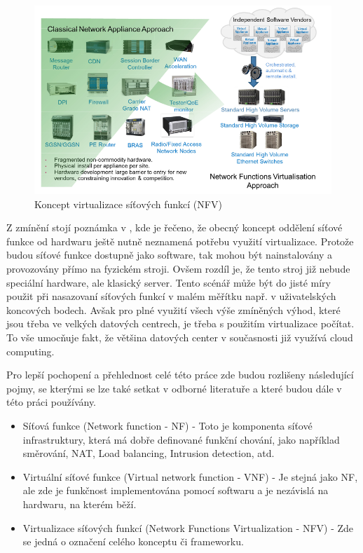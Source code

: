 \begin{figure}[h]
\begin{centering}
\includegraphics[scale=0.5]{images/vize_NFV}
\par\end{centering}
\caption{Koncept virtualizace síťových funkcí (NFV)\label{fig:vize_NFV}}
\end{figure}

Z zmínění stojí poznámka v \cite{NFVState}, kde je řečeno, že obecný koncept oddělení síťové funkce od hardwaru ještě nutně neznamená potřebu využití virtualizace. Protože budou síťové funkce dostupně jako software, tak mohou být nainstalovány a provozovány přímo na fyzickém stroji. Ovšem rozdíl je, že tento stroj již nebude speciální hardware, ale klasický server. Tento scénář může být do jisté míry použit při nasazovaní síťových funkcí v malém měřítku např. v uživatelských koncových bodech. Avšak pro plné využití všech výše zmíněných výhod, které jsou třeba ve velkých datových centrech, je třeba s použitím virtualizace počítat. To vše umocňuje fakt, že většina datových center v současnosti již využívá cloud computing.

Pro lepší pochopení a přehlednost celé této práce zde budou rozlišeny následující pojmy, se kterými se lze také setkat v odborné literatuře a které budou dále v této práci používány. 

\begin{itemize}
\item Síťová funkce (Network function - NF) - Toto je komponenta síťové infrastruktury, která má dobře definované funkční chování, jako například směrování, NAT, Load balancing, Intrusion detection, atd.
\item Virtuální síťové funkce (Virtual network function - VNF) - Je stejná jako NF, ale zde je funkčnost implementována pomocí softwaru a je nezávislá na hardwaru, na kterém běží.
\item Virtualizace síťových funkcí (Network Functions Virtualization - NFV) - Zde se jedná o označení celého konceptu či frameworku.
\end{itemize}

